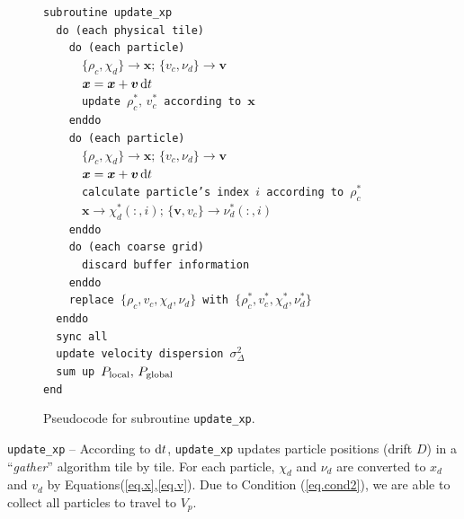 \documentclass[10pt,twocolumn,preprint]{emulateapj}
\newcommand{\bs}{\boldsymbol}
\begin{document}
\begin{figure}[t]
{\tt subroutine update\_xp\\
\indent \ \ do (each physical tile)\\
\indent \ \ \ \ do (each particle)\\
\indent \ \ \ \ \ \ $\{\rho_c,\chi_d\}\rightarrow {\bs x};\,\{v_c,\nu_d\}\rightarrow {\bs v}$\\
\indent \ \ \ \ \ \ ${\bs x}={\bs x}+{\bs v}\,{\rm d}t$\\
\indent \ \ \ \ \ \ update $\rho_c^*,\,v_c^*$ according to ${\bs x}$\\
\indent \ \ \ \ enddo\\
\indent \ \ \ \ do (each particle)\\
\indent \ \ \ \ \ \ $\{\rho_c,\chi_d\}\rightarrow {\bs x};\,\{v_c,\nu_d\}\rightarrow {\bs v}$\\
\indent \ \ \ \ \ \ ${\bs x}={\bs x}+{\bs v}\,{\rm d}t$\\
\indent \ \ \ \ \ \ calculate particle's index $i$ according to $\rho_c^*$\\
\indent \ \ \ \ \ \ ${\bs x}\rightarrow\chi_d^*(:,i);\,\{{\bs v},v_c\}\rightarrow\nu_d^*(:,i)$\\
\indent \ \ \ \ enddo\\
\indent \ \ \ \ do (each coarse grid)\\
\indent \ \ \ \ \ \ discard buffer information\\
\indent \ \ \ \ enddo\\
\indent \ \ \ \ replace $\{\rho_c,v_c,\chi_d,\nu_d\}$ with $\{\rho_c^*,v_c^*,\chi_d^*,\nu_d^*\}$\\
\indent \ \ enddo\\
\indent \ \ sync all\\
\indent \ \ update velocity dispersion $\sigma^2_{\Delta}$\\
\indent \ \ sum up $P_{\rm local},\,P_{\rm global}$\\
end\\}
\caption{Pseudocode for subroutine {\tt update\_xp}.}
\label{fig.update_xp}
\end{figure}


{\tt update\_xp} --
According to ${\rm d}t$, {\tt update\_xp} updates particle positions (drift $D$) in a ``{\it gather}'' algorithm
tile by tile. For each particle, $\chi_d$ and $\nu_d$ are converted to $x_d$ and $v_d$ by Equations(\ref{eq.x},\ref{eq.v}). Due to Condition (\ref{eq.cond2}), we are able to collect all particles to travel to $V_p$.
\end{document}
